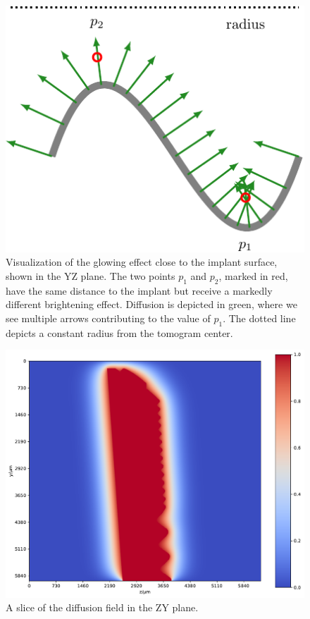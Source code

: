 \begin{figure}
    \centering
    \includegraphics{figures/glowing-crop}
    \caption{
        Visualization of the glowing effect close to the implant surface, shown
        in the YZ plane. The two points $p_1$ and $p_2$, marked in red, have
        the same distance to the implant but receive a markedly different
        brightening effect. Diffusion is depicted in green, where we see
        multiple arrows contributing to the value of $p_1$. The dotted line
        depicts a constant radius from the tomogram center.
    }
    \label{fig:edt-vs-diffusion}
\end{figure}

\begin{figure}
    \centering
    \includegraphics[width=0.75\linewidth]{generated/770c_pag_diffusion_zy.pdf}
    \caption{A slice of the diffusion field in the ZY plane.}
    \label{fig:field-slice}
\end{figure}


